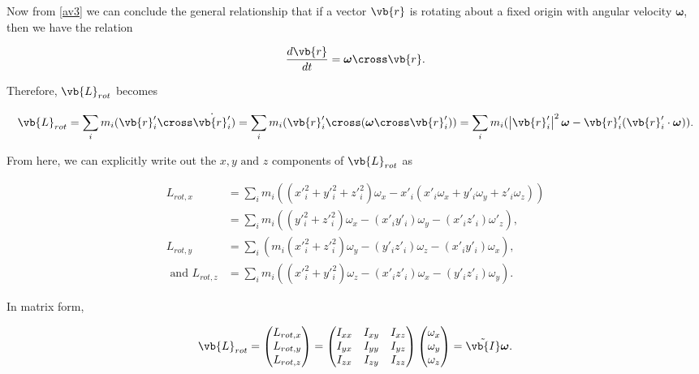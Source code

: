 \documentclass[a4paper,12pt]{report}
\begin{document}
Now from \cref{av3} we can conclude the general relationship that if a vector \(\vb{r} \)  is rotating about a fixed origin with angular velocity \(\boldsymbol{\omega } \), then we have the relation 

\begin{equation}
	\frac{d \vb{r}}{dt} =  \boldsymbol{\omega } \cross \vb{r} . \label{rotchange}  
\end{equation}

Therefore, \(\vb{L} _{rot} \)  becomes

\begin{equation}
	\vb{L} _{rot} = \sum_{i}^{} m_{i} (\vb{r} '_{i} \cross \dot{\vb{r} '_{i} } ) = \sum_{i}^{} m_{i} (\vb{r} '_{i} \cross (\boldsymbol{\omega } \cross \vb{r} '_{i}) ) = \sum_{i}^{} m_{i} (\left| \vb{r} '_{i}  \right| ^2 \boldsymbol{\omega } - \vb{r} '_{i} (\vb{r} '_{i} \cdot \boldsymbol{\omega } )). 
\end{equation}

From here, we can explicitly write out the \(x,y \text{ and } z\) components of \(\vb{L} _{rot} \) as

\begin{equation}
	\begin{aligned}
		L_{rot,x} &= \sum_{i}^{} m_{i} ((x'^2_i + y'^2_i + z'^2_i)\omega  _{x} - x'_{i} (x'_{i} \omega _{x} + y'_{i} \omega _{y} + z'_{i} \omega _{z} )) \\ 
		      &= \sum_{i}^{} m_{i} ((y'^2_i + z'^2_i)\omega _{x} - (x'_{i} y'_{i} )\omega _{y} - (x'_{i} z'_{i}) \omega '_{z}) , \\ 
		L_{rot,y} &= \sum_{i}^{} (m_{i} (x'^2_i + z'^2_i)\omega _{y} - (y'_{i} z'_{i} )\omega _{z} - (x'_{i} y'_{i} )\omega _{x}), \\ 
		\text{ and }  L_{rot,z} &= \sum_{i}^{} m_{i} ((x'^2_i + y'^2_i) \omega _{z} - (x'_{i} z'_{i} )\omega _{x} - (y'_{i} z'_{i} )\omega _{y}) . 
	\end{aligned}
\end{equation}

In matrix form, 

\begin{equation}
	\vb{L}_{rot}  = 
	\begin{pmatrix}
	L_{rot,x} \\
	L_{rot,y} \\
	L_{rot,z} 
	\end{pmatrix}
	= \begin{pmatrix}
	I_{xx}  & I_{xy}  & I_{xz} \\
	I_{yx}  & I_{yy}  & I_{yz} \\
	I_{zx}  & I_{zy}  & I_{zz} 
	\end{pmatrix}
	\begin{pmatrix}
	\omega _{x} \\
	\omega _{y} \\
	\omega _{z} 
	\end{pmatrix}
	=\tilde{\vb{I} } \boldsymbol{\omega } .		
\end{equation}
\end{document}

